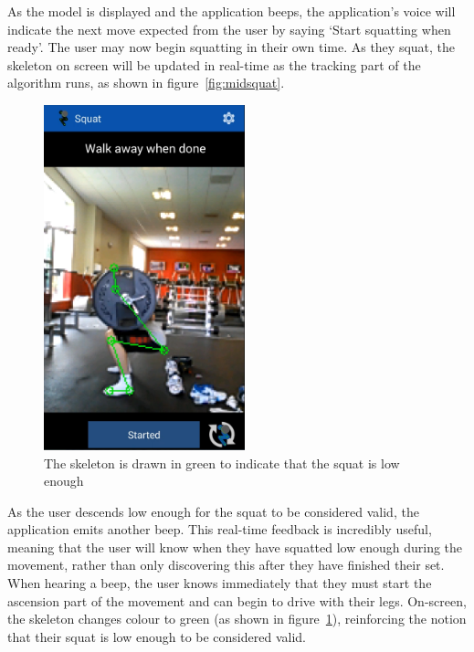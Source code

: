 As the model is displayed and the application beeps, the application's voice will indicate the next move expected from the user by saying `Start squatting when ready'. The user may now begin squatting in their own time. As they squat, the skeleton on screen will be updated in real-time as the tracking part of the algorithm runs, as shown in figure~\ref{fig:midsquat}.

\begin{figure}[H]
    \centering
	\includegraphics[height=10cm]{application/images/belowparallel}
\caption{The skeleton is drawn in green to indicate that the squat is low enough}
\label{fig:belowparallel}
\end{figure}

As the user descends low enough for the squat to be considered valid, the application emits another beep. This real-time feedback is incredibly useful, meaning that the user will know when they have squatted low enough during the movement, rather than only discovering this after they have finished their set. When hearing a beep, the user knows immediately that they must start the ascension part of the movement and can begin to drive with their legs. On-screen, the skeleton changes colour to green (as shown in figure~\ref{fig:belowparallel}), reinforcing the notion that their squat is low enough to be considered valid.

